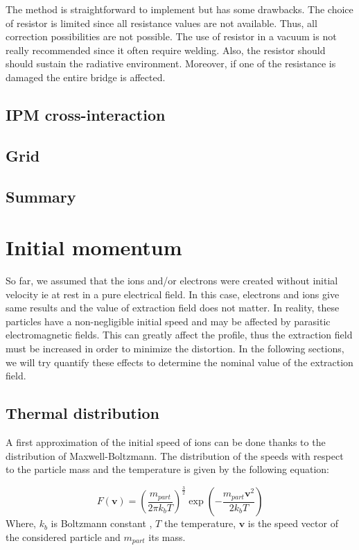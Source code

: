 \begin{refsection}
  The method is straightforward to implement but has some drawbacks. The choice of resistor is limited since all resistance values are not available. Thus, all correction possibilities are not possible. The use of resistor in a vacuum is not really recommended since it often require welding. Also, the resistor should should sustain the radiative environment. Moreover, if one of the resistance is damaged the entire bridge is affected.

  \subsection{IPM cross-interaction}

  

  \subsection{Grid}

  \subsection{Summary}

  \section{Initial momentum}
  So far, we assumed that the ions and/or electrons were created without initial velocity ie at rest in a pure electrical field. In this case, electrons and ions give same results and the value of extraction field does not matter. In reality, these particles have a non-negligible initial speed and may be affected by parasitic electromagnetic fields. This can greatly affect the profile, thus the extraction field must be increased in order to minimize the distortion. In the following sections, we will try quantify these effects to determine the nominal value of the extraction field.

  \subsection{Thermal distribution}
  A first approximation of the initial speed of ions can be done thanks to the distribution of Maxwell-Boltzmann. The distribution of the speeds with respect to the particle mass and the temperature is given by the following equation:

  \begin{equation}
    F(\boldsymbol{v}) = \left(\frac{m_{part}}{2 \pi k_{b} T}\right)^{\frac{3}{2}}\exp\left(-\frac{m_{part}\boldsymbol{v}^{2}}{2 k_{b} T}\right)
  \end{equation}
  Where, $k_{b}$ is Boltzmann constant , $T$ the temperature, $\boldsymbol{v}$ is the speed vector of the considered particle and $m_{part}$ its mass.


\end{refsection}
